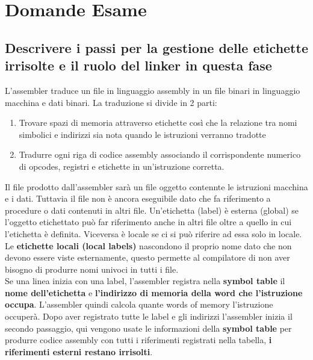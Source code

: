 \documentclass[12pt, a4paper, openany]{book}
\begin{document}
\section{Domande Esame}
\subsection{Descrivere i passi per la gestione delle etichette irrisolte e il ruolo
del linker in questa fase}
L'assembler traduce un file in linguaggio assembly in un file binari in linguaggio macchina
e dati binari. La traduzione si divide in 2 parti: 
\begin{enumerate}
    \item Trovare spazi di memoria attraverso etichette così che la relazione
    tra nomi simbolici e indirizzi sia nota quando le istruzioni verranno tradotte
    \item Tradurre ogni riga di codice assembly associando il corrispondente numerico di
    opcodes, registri e etichette in un'istruzione corretta.
\end{enumerate}
Il file prodotto dall'assembler sarà un file oggetto contennte le istruzioni macchina e i dati.
Tuttavia il file non è ancora eseguibile dato che fa riferimento a procedure o dati contenuti
in altri file. Un'etichetta (label) è esterna (global) se l'oggetto etichettato può far riferimento
anche in altri file oltre a quello in cui l'etichetta è definita. Viceversa è locale se ci si può riferire
ad essa solo in locale. Le \textbf{etichette locali (local labels)} nascondono il proprio nome dato
che non devono essere viste esternamente, questo permette al compilatore di non aver bisogno di produrre nomi univoci
in tutti i file.
\\ Se una linea inizia con una label, l'assembler registra nella \textbf{symbol table} il
\textbf{nome dell'etichetta} e \textbf{l'indirizzo di memoria della word che l'istruzione occupa}.
L'assembler quindi calcola quante words of memory l'istruzione occuperà.
Dopo aver registrato tutte le label e gli indirizzi l'assembler inizia il secondo passaggio,
qui vengono usate le informazioni della \textbf{symbol table} per produrre codice assembly
con tutti i riferimenti registrati nella tabella, \textbf{i riferimenti esterni restano irrisolti}.
\end{document}
